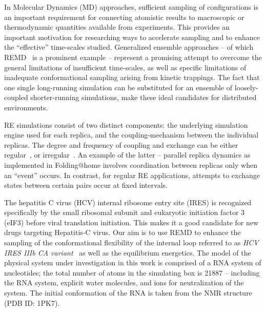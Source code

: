 \documentclass{rspublic}
\newcommand{\jhanote}[1]{ {\textcolor{red} { ***SJ: #1 }}}
\newcommand{\jhanote}[1]{}
\begin{document}

In Molecular Dynamics (MD) approaches, sufficient sampling of
configurations is an important requirement for connecting atomistic
results to macroscopic or thermodynamic quantities available from
experiments. This provides an important motivation for researching ways 
to accelerate sampling and to enhance the ``effective''
time-scales studied. 
Generalized ensemble approaches -- of which
REMD~\citep{Sugita:1999rm} is a prominent example -- represent a
promising attempt to overcome the general limitations of
insufficient time-scales, as well as specific limitations of
inadequate conformational sampling arising from kinetic trappings.
The fact that one single long-running simulation can be substituted
for an ensemble of loosely-coupled shorter-running simulations, make
these ideal candidates for distributed environments.

RE simulations consist of
two distinct components: the underlying simulation engine
used for each replica, and the coupling-mechanism between the
individual replicas.  
The degree and frequency of coupling and exchange can be either
regular~\citep{Sugita:1999rm}, or irregular~\citep{SPdynamics}. 
An example of the latter -- parallel replica dynamics as 
implemented in Folding@home
\citep{folding} involves coordination between replicas only when an
``event'' occurs.  In contrast, for regular RE applications, attempts
to exchange states between certain pairs occur at fixed intervals. 



The hepatitis C virus (HCV) internal ribosome entry site (IRES) is
recognized specifically by the small ribosomal subunit and eukaryotic
initiation factor 3 (eIF3) before viral translation initiation.  This
makes it a good candidate for new drugs targeting Hepatitis-C virus.
Our aim is to use REMD to enhance the sampling of the conformational
flexibility of the internal loop referred to as {\it HCV IRES IIIb CA
  variant}~\citep{Collier:2002wd} as well as the equilibrium
energetics.  The model of the physical system under investigation in
this work is comprised of a RNA system of nucleotides; the total
number of atoms in the simulating box is 21887 -- including the RNA
system, explicit water molecules, and ions for neutralization of the
system.  The initial conformation of the RNA is taken from the NMR
structure (PDB ID: 1PK7).
\end{document}
